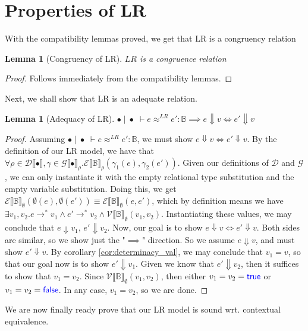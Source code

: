 \documentclass[twoside,11pt,openright]{report}
\newtheorem{lemma}[theorem]{Lemma}
\theoremstyle{definition}
\newcommand{\Keyword}[1]{{\color{blue} \mathsf{#1}}}
\newcommand{\expr}{e}
\newcommand{\val}{v}
\newcommand{\True}{\Keyword{true}}
\newcommand{\False}{\Keyword{false}}
\newcommand{\Tbool}{\mathbb{B}}
\newcommand{\emptenv}{\bullet}
\newcommand{\empvenv}{\bullet}
\newcommand{\jdgRel}[6]{#1 \; | \; #2 \; \vdash #3 \approx^{#4} #5 : #6}
\newcommand{\stepS}{\rightarrow^*}
\newcommand{\ValInp}[2]{\mathcal{V} \llbracket #1 \rrbracket_{#2}}
\newcommand{\ExpInp}[2]{\mathcal{E} \llbracket #1 \rrbracket_{#2}}
\newcommand{\VenvInp}[2]{\mathcal{G} \llbracket #1 \rrbracket_{#2}}
\newcommand{\TenvInp}[1]{\mathcal{D} \llbracket #1 \rrbracket}
\newcommand{\LogRel}[5]{\jdgRel{#1}{#2}{#3}{LR}{#4}{#5}}
\begin{document}
\section{Properties of LR}
With the compatibility lemmas proved, we get that LR is a congruency relation
\begin{lemma}[Congruency of LR]\label{lem:LR_cong}
  $LR$ is a congruence relation
\end{lemma}
\begin{proof}
  Follows immediately from the compatibility lemmas.
\end{proof}
Next, we shall show that LR is an adequate relation.
\begin{lemma}[Adequacy of LR]\label{lem:LR_adeq}
  $\LogRel{\emptenv}{\empvenv}{\expr}{\expr'}{\Tbool} \implies \expr \Downarrow \val \iff \expr' \Downarrow \val$
\end{lemma}
\begin{proof}
  Assuming $\LogRel{\emptenv}{\empvenv}{\expr}{\expr'}{\Tbool}$, we must show 
  $\expr \Downarrow \val \iff \expr' \Downarrow \val$. By the definition of our LR model, we have that $\forall \rho \in \TenvInp{\emptenv}, \gamma \in \VenvInp{\empvenv}{\rho} . \ExpInp{\Tbool}{\rho}(\gamma_1(\expr), \gamma_2(\expr'))$. Given our definitions of $\mathcal{D}$ and $\mathcal{G}$, we can only instantiate it with the empty relational type substitution and the empty variable substitution. Doing this, we get $\ExpInp{\Tbool}{\emptyset}(\emptyset(\expr), \emptyset(\expr')) \equiv \ExpInp{\Tbool}{\emptyset}(\expr, \expr')$, which by definition means we have $\exists \val_1, \val_2 . \expr \stepS \val_1 \land \expr' \stepS \val_2 \land \ValInp{\Tbool}{\emptyset}(\val_1, \val_2)$. Instantiating these values, we may conclude that $\expr \Downarrow \val_1$, $\expr' \Downarrow \val_2$. Now, our goal is to show $\expr \Downarrow \val \iff \expr' \Downarrow \val$. Both sides are similar, so we show just the "$\implies$" direction. So we assume $\expr \Downarrow \val$, and must show $\expr' \Downarrow \val$. By corollary \ref{cor:determinacy_val}, we may conclude that $\val_1 = \val$, so that our goal now is to show $\expr' \Downarrow \val_1$. Given we know that $\expr' \Downarrow \val_2$, then it suffices to show that $\val_1 = \val_2$. Since $\ValInp{\Tbool}{\emptyset}(\val_1, \val_2)$, then either $\val_1 = \val_2 = \True$ or $\val_1 = \val_2 = \False$. In any case, $\val_1 = \val_2$, so we are done.
\end{proof}
We are now finally ready prove that our LR model is sound wrt. contextual equivalence.
\end{document}
